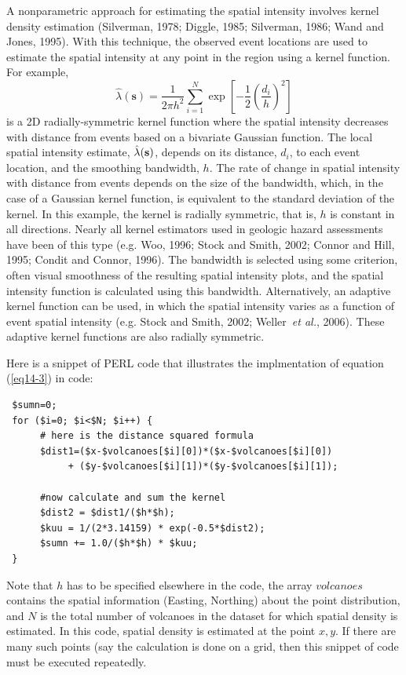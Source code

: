 \documentclass[10pt]{article}
\begin{document}
A nonparametric approach for estimating the spatial intensity involves kernel density estimation (Silverman, 1978; Diggle, 1985; Silverman, 1986; Wand and Jones, 1995). With this technique, the observed event locations are used to estimate the spatial intensity at any point in the region using a kernel function. For example,
\begin{equation}
\hat\lambda (\mathbf{s}) = \frac{1}{2\pi h^2}\sum^N_{i=1} \exp \left[ -\frac{1}{2} \left(\frac{d_i}{h}\right)^2 \right]
\label{eq14-3}
\end{equation}
is a 2D radially-symmetric kernel function where the spatial intensity decreases with distance from events based on a bivariate Gaussian function. The local spatial intensity estimate, $\hat\lambda(\bf{s})$, depends on its distance, $d_i$, to each event location, and the smoothing bandwidth, $h$. The rate of change in spatial intensity with distance from events depends on the size of the bandwidth, which, in the case of a Gaussian kernel function, is equivalent to the standard deviation of the kernel. In this example, the kernel is radially symmetric, that is, $h$ is constant in all directions. Nearly all kernel estimators used in geologic hazard assessments have been of this type (e.g. Woo, 1996; Stock and Smith, 2002; Connor and Hill, 1995; Condit and Connor, 1996). The bandwidth is selected using some criterion, often visual smoothness of the resulting spatial intensity plots, and the spatial intensity function is calculated using this bandwidth. Alternatively, an adaptive kernel function can be used, in which the spatial intensity varies as a function of event spatial intensity (e.g. Stock and Smith, 2002; Weller~{\it et al.}, 2006). These adaptive kernel functions are also radially symmetric.

Here is a snippet of PERL code that illustrates the implmentation of equation (\ref{eq14-3}) in code:
\begin{verbatim}
 $sumn=0;
 for ($i=0; $i<$N; $i++) {
      # here is the distance squared formula
      $dist1=($x-$volcanoes[$i][0])*($x-$volcanoes[$i][0]) 
           + ($y-$volcanoes[$i][1])*($y-$volcanoes[$i][1]);

      #now calculate and sum the kernel
      $dist2 = $dist1/($h*$h);
      $kuu = 1/(2*3.14159) * exp(-0.5*$dist2);
      $sumn += 1.0/($h*$h) * $kuu;
 }
\end{verbatim}

Note that $h$ has to be specified elsewhere in the code, the array $volcanoes$ contains the spatial information (Easting, Northing) about the point distribution, and $N$ is the total number of volcanoes in the dataset for which spatial density is estimated. In this code, spatial density is estimated at the point $x, y$. If there are many such points (say the calculation is done on a grid, then this snippet of code must be executed repeatedly.
\end{document}
